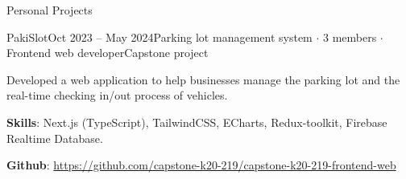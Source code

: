 \documentclass{resume} %
\begin{document}
\begin{rSection}{Personal Projects}
\begin{rSubsection}{PakiSlot}{Oct 2023 – May 2024}{Parking lot management system {$\cdot$} 3 members {$\cdot$} Frontend web developer}{Capstone project}
\item Developed a web application to help businesses manage the parking lot and the real-time checking in/out process of vehicles.
\item {\bf Skills}: Next.js (TypeScript), TailwindCSS, ECharts, Redux-toolkit, Firebase Realtime Database.
\item {\bf Github}: \href{https://github.com/capstone-k20-219/capstone-k20-219-frontend-web}{https://github.com/capstone-k20-219/capstone-k20-219-frontend-web}
\end{rSubsection}



\end{rSection}
\end{document}
